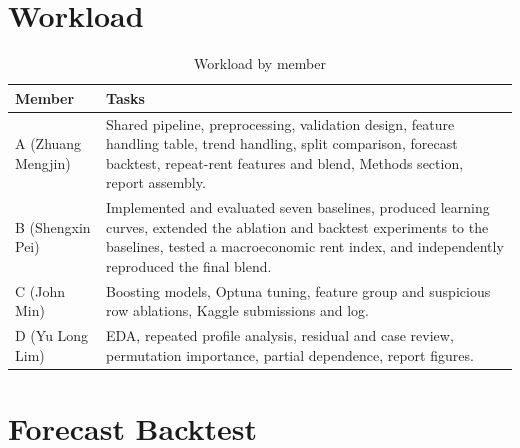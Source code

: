 \newpage
\section{Workload}\label{app:workload}

\begin{table}[!h]
\caption{Workload by member}
\label{tab:workload}
\centering
\footnotesize
\begin{tabular}{p{}p{}}
\hline
\textbf{Member} & \textbf{Tasks} \\
\hline
A (Zhuang Mengjin) & Shared pipeline, preprocessing, validation design, feature handling table, trend handling, split comparison, forecast backtest, repeat-rent features and blend, Methods section, report assembly. \\
B (Shengxin Pei) & Implemented and evaluated seven baselines, produced learning curves, extended the ablation and backtest experiments to the baselines, tested a macroeconomic rent index, and independently reproduced the final blend. \\
C (John Min) & Boosting models, Optuna tuning, feature group and suspicious row ablations, Kaggle submissions and log. \\
D (Yu Long Lim) & EDA, repeated profile analysis, residual and case review, permutation importance, partial dependence, report figures. \\
\hline
\end{tabular}
\end{table}

\section{Forecast Backtest}\label{app:backtest}

\begin{table}[!h]
\caption{RMSE (SGD) when the fit window ends earlier, by months ahead, G0+G1 features. Only 12 months follow the 2024-03 fit, so its last row covers months 7 to 12. Hyperparameters are the final ones, so these runs borrow some information from later data.}
\label{tab:horizon}
\centering
\footnotesize

\end{table}

\begin{table}[!ht]
\caption{Baseline RMSE (SGD), averaged with equal weight over the five training cutoffs in Table~\ref{tab:horizon}. Near covers months 1 to 6 and far covers months 7 to 16 (7 to 12 for March 2024).}
\label{tab:baseline-horizon}
\centering
\footnotesize

\end{table}


